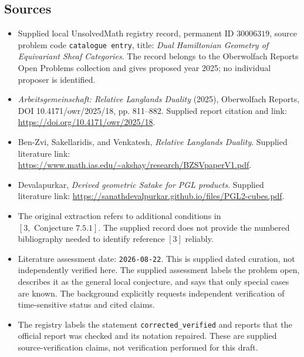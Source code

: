 \documentclass[11pt]{article}
\begin{document}
\subsection{Sources}
\begin{itemize}
\item Supplied local UnsolvedMath registry record, permanent ID \(30006319\), source problem code \texttt{catalogue entry}, title: \emph{Dual Hamiltonian Geometry of Equivariant Sheaf Categories}. The record belongs to the Oberwolfach Reports Open Problems collection and gives proposed year 2025; no individual proposer is identified.
\item \emph{Arbeitsgemeinschaft: Relative Langlands Duality} (2025), Oberwolfach Reports, DOI 10.4171/owr/2025/18, pp. 811--882. Supplied report citation and link: \url{https://doi.org/10.4171/owr/2025/18}.
\item Ben-Zvi, Sakellaridis, and Venkatesh, \emph{Relative Langlands Duality}. Supplied literature link: \url{https://www.math.ias.edu/~akshay/research/BZSVpaperV1.pdf}.
\item Devalapurkar, \emph{Derived geometric Satake for PGL products}. Supplied literature link: \url{https://sanathdevalpurkar.github.io/files/PGL2-cubes.pdf}.
\item The original extraction refers to additional conditions in \([3,\text{ Conjecture }7.5.1]\). The supplied record does not provide the numbered bibliography needed to identify reference \([3]\) reliably.
\item Literature assessment date: \texttt{2026-08-22}. This is supplied dated curation, not independently verified here. The supplied assessment labels the problem open, describes it as the general local conjecture, and says that only special cases are known. The background explicitly requests independent verification of time-sensitive status and cited claims.
\item The registry labels the statement \texttt{corrected\_verified} and reports that the official report was checked and its notation repaired. These are supplied source-verification claims, not verification performed for this draft.
\end{itemize}
\end{document}
